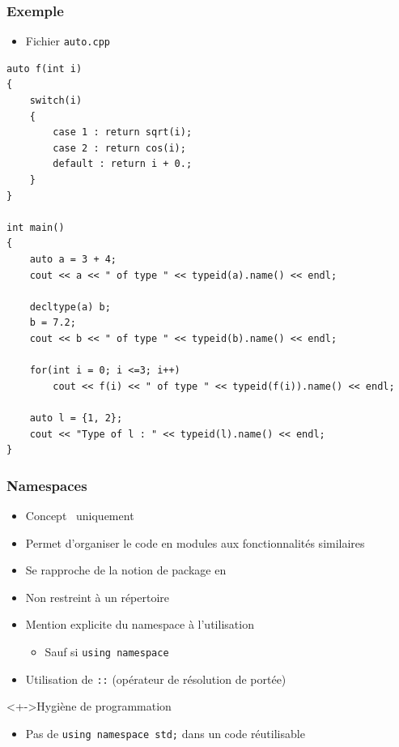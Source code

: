 \begin{frame}[containsverbatim]
\frametitle{Exemple}
\begin{itemize}
\item Fichier \texttt{auto.cpp}
\end{itemize}
\begin{lstlisting}
auto f(int i)
{
	switch(i)
	{
		case 1 : return sqrt(i);
		case 2 : return cos(i);
		default : return i + 0.;
	}	
}

int main()
{
	auto a = 3 + 4;
	cout << a << " of type " << typeid(a).name() << endl;

	decltype(a) b; 
	b = 7.2;
	cout << b << " of type " << typeid(b).name() << endl;

	for(int i = 0; i <=3; i++)
		cout << f(i) << " of type " << typeid(f(i)).name() << endl;

	auto l = {1, 2};
	cout << "Type of l : " << typeid(l).name() << endl;
}
\end{lstlisting}
\end{frame}

\begin{frame}
\frametitle{Namespaces}
\begin{itemize}[<+->]
\item Concept \cpp\ uniquement
\item Permet d'organiser le code en modules aux fonctionnalités similaires
\item Se rapproche de la notion de package en \java
\item Non restreint à un répertoire
\item Mention explicite du namespace à l'utilisation
	\begin{itemize}
	\item Sauf si \lstinline|using namespace|
	\end{itemize}
\item Utilisation de \texttt{::} (opérateur de résolution de portée)
\end{itemize}
\begin{block}<+->{Hygiène de programmation}
	\begin{itemize}[<+->]
	\item Pas de \lstinline|using namespace std;| dans un code réutilisable
	\end{itemize}
\end{block}
\end{frame}

